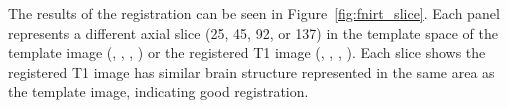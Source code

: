 \gobblepars

 
The results of the registration can be seen in Figure~\ref{fig:fnirt_slice}.  Each panel represents a different axial slice (25, 45, 92, or 137) in the template space of the template image (\protect{}, \protect{}, \protect{}, \protect{}) or the registered T1 image (\protect{}, \protect{}, \protect{}, \protect{}).  Each slice shows the registered T1 image has similar brain structure represented in the same area as the template image, indicating good registration.




